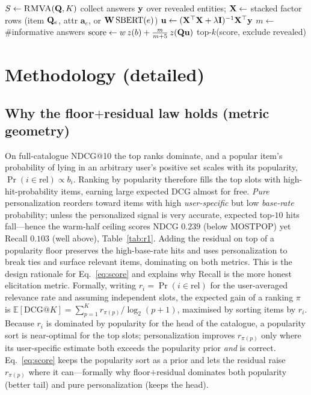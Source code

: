 \begin{algorithm}[h]\small
\caption{Cold-start inference}
\begin{algorithmic}[1]
\State $S \gets \textsc{RMVA}(\mathbf{Q},K)$ 
\State collect answers $\mathbf{y}$ over revealed entities; $\mathbf{X} \gets$ stacked factor rows (item $\mathbf{Q}_e$, attr $\mathbf a_e$, or $\mathbf{W}\,\mathrm{SBERT}(e)$)
\State $\mathbf{u} \gets (\mathbf{X}^\top\mathbf{X}+\lambda\mathbf{I})^{-1}\mathbf{X}^\top\mathbf{y}$ 
\State $m \gets$ \#informative answers
\State $\mathrm{score} \gets w\,z(b) + \tfrac{m}{m+5}\,z(\mathbf{Q}\mathbf{u})$
\State \Return top-$k$(score, exclude revealed)
\end{algorithmic}
\end{algorithm}

\section{Methodology (detailed)}\label{sec:method}

\subsection{Why the floor$+$residual law holds (metric geometry)}\label{sec:law}
On full-catalogue NDCG@10 the top ranks dominate, and a popular item's probability of lying in an arbitrary user's
positive set scales with its popularity, $\Pr(i\in\mathrm{rel})\propto b_i$. Ranking by popularity therefore fills
the top slots with high-hit-probability items, earning large expected DCG almost for free. \emph{Pure}
personalization reorders toward items with high \emph{user-specific} but low \emph{base-rate} probability; unless
the personalized signal is very accurate, expected top-$10$ hits fall---hence the warm-half ceiling scores NDCG
$0.239$ (below MOSTPOP) yet Recall $0.103$ (well above), Table~\ref{tab:r1}. Adding the residual on top of a
popularity floor preserves the high-base-rate hits and uses personalization to break ties and surface relevant
items, dominating on both metrics. This is the design rationale for Eq.~\eqref{eq:score} and explains why Recall
is the more honest elicitation metric. Formally, writing $r_i=\Pr(i\in\mathrm{rel})$ for the user-averaged
relevance rate and assuming independent slots, the expected gain of a ranking $\pi$ is
$\mathbb E[\mathrm{DCG@}K]=\sum_{p=1}^{K} r_{\pi(p)}/\log_2(p{+}1)$, maximised by sorting items by $r_i$. Because
$r_i$ is dominated by popularity for the head of the catalogue, a popularity sort is near-optimal for the top
slots; personalization improves $r_{\pi(p)}$ only where its user-specific estimate both exceeds the popularity
prior \emph{and} is correct. Eq.~\eqref{eq:score} keeps the popularity sort as a prior and lets the residual raise
$r_{\pi(p)}$ where it can---formally why floor$+$residual dominates both popularity (better tail) and pure
personalization (keeps the head).


